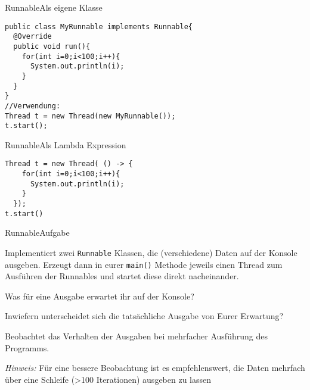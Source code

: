 \begin{frame}[fragile]{Runnable}{Als eigene Klasse}
\lstset{style=java}
\begin{lstlisting}
public class MyRunnable implements Runnable{
  @Override
  public void run(){
    for(int i=0;i<100;i++){
      System.out.println(i);
    }
  }
}
//Verwendung:
Thread t = new Thread(new MyRunnable());
t.start();
\end{lstlisting}
\end{frame}

\begin{frame}[fragile]{Runnable}{Als Lambda Expression}
\lstset{style=java}
\begin{lstlisting}
Thread t = new Thread( () -> {
    for(int i=0;i<100;i++){
      System.out.println(i);
    }
  });
t.start()
\end{lstlisting}
\end{frame}

\begin{frame}{Runnable}{Aufgabe}
    \begin{alertblock}{}
    Implementiert zwei \texttt{Runnable} Klassen, die (verschiedene) Daten auf der Konsole ausgeben. Erzeugt dann in eurer \texttt{main()} Methode jeweils einen Thread zum Ausführen der Runnables und startet diese direkt nacheinander. 
    
    Was für eine Ausgabe erwartet ihr auf der Konsole?
    
    Inwiefern unterscheidet sich die tatsächliche Ausgabe von Eurer Erwartung?
    
    Beobachtet das Verhalten der Ausgaben bei mehrfacher Ausführung des Programms.
    
    \textit{Hinweis:} Für eine bessere Beobachtung ist es empfehlenswert, die Daten mehrfach über eine Schleife (>100 Iterationen) ausgeben zu lassen
    \end{alertblock}
\end{frame}